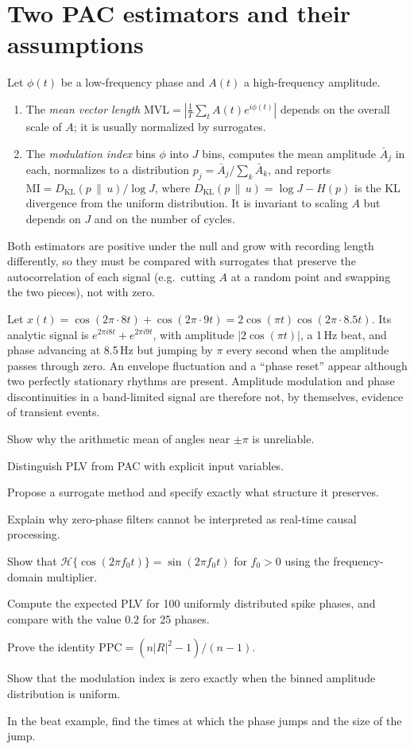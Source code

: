 \section{Two PAC estimators and their assumptions}
Let $\phi(t)$ be a low-frequency phase and $A(t)$ a high-frequency amplitude.
\begin{enumerate}[leftmargin=2em]
\item The \emph{mean vector length} $\mathrm{MVL}=|\frac1T\sum_tA(t)e^{i\phi(t)}|$ depends on the overall scale of $A$; it is usually normalized by surrogates.
\item The \emph{modulation index} bins $\phi$ into $J$ bins, computes the mean amplitude $\bar A_j$ in each, normalizes to a distribution $p_j=\bar A_j/\sum_k\bar A_k$, and reports $\mathrm{MI}=D_{\mathrm{KL}}(p\,\|\,u)/\log J$, where $D_{\mathrm{KL}}(p\,\|\,u)=\log J-H(p)$ is the KL divergence from the uniform distribution. It is invariant to scaling $A$ but depends on $J$ and on the number of cycles.
\end{enumerate}
Both estimators are positive under the null and grow with recording length differently, so they must be compared with surrogates that preserve the autocorrelation of each signal (e.g.\ cutting $A$ at a random point and swapping the two pieces), not with zero.

\begin{workedexample}
Let $x(t)=\cos(2\pi\cdot 8t)+\cos(2\pi\cdot 9t)=2\cos(\pi t)\cos(2\pi\cdot8.5t)$. Its analytic signal is $e^{2\pi i8t}+e^{2\pi i9t}$, with amplitude $|2\cos(\pi t)|$, a 1\,Hz beat, and phase advancing at 8.5\,Hz but jumping by $\pi$ every second when the amplitude passes through zero. An envelope fluctuation and a ``phase reset'' appear although two perfectly stationary rhythms are present. Amplitude modulation and phase discontinuities in a band-limited signal are therefore not, by themselves, evidence of transient events.
\end{workedexample}
\begin{exercises}
\item Show why the arithmetic mean of angles near $\pm\pi$ is unreliable.
\item Distinguish PLV from PAC with explicit input variables.
\item Propose a surrogate method and specify exactly what structure it preserves.
\item Explain why zero-phase filters cannot be interpreted as real-time causal processing.
\item Show that $\mathcal H\{\cos(2\pi f_0t)\}=\sin(2\pi f_0t)$ for $f_0>0$ using the frequency-domain multiplier.
\item Compute the expected PLV for 100 uniformly distributed spike phases, and compare with the value $0.2$ for 25 phases.
\item Prove the identity $\mathrm{PPC}=(n|R|^2-1)/(n-1)$.
\item Show that the modulation index is zero exactly when the binned amplitude distribution is uniform.
\item In the beat example, find the times at which the phase jumps and the size of the jump.
\end{exercises}
